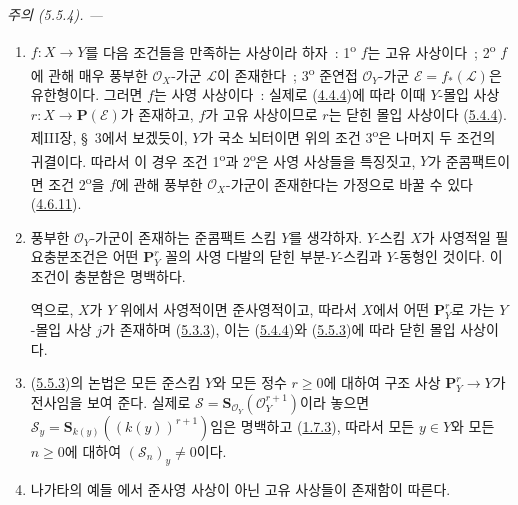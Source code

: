 \par\medskip\noindent\textit{주의 (5.5.4). ---\ }
\label{II.5.5.4-ko}
\begin{enumerate}
  \item[\rm{(i)}] $f:X\to Y$를 다음 조건들을 만족하는 사상이라 하자~:
  1\textsuperscript{o} $f$는 고유 사상이다~; 2\textsuperscript{o}
  $f$에 관해 매우 풍부한 $\mathcal{O}_X$-가군 $\mathcal{L}$이
  존재한다~; 3\textsuperscript{o} 준연접 $\mathcal{O}_Y$-가군
  $\mathcal{E}=f_*(\mathcal{L})$은 유한형이다. 그러면 $f$는 사영
  사상이다~: 실제로 (\hyperref[II.4.4.4-ko]{4.4.4})에 따라 이때
  $Y$-몰입 사상 $r:X\to\mathbf{P}(\mathcal{E})$가 존재하고, $f$가
  고유 사상이므로 $r$는 닫힌 몰입 사상이다
  (\hyperref[II.5.4.4-ko]{5.4.4}). 제III장, \S~3에서 보겠듯이, $Y$가
  국소 뇌터이면 위의 조건 3\textsuperscript{o}은 나머지 두 조건의
  귀결이다. 따라서 이 경우 조건 1\textsuperscript{o}과
  2\textsuperscript{o}은 사영 사상들을 특징짓고, $Y$가 준콤팩트이면
  조건 2\textsuperscript{o}을 $f$에 관해 풍부한
  $\mathcal{O}_X$-가군이 존재한다는 가정으로 바꿀 수 있다
  (\hyperref[II.4.6.11-ko]{4.6.11}).
  \item[\rm{(ii)}] 풍부한 $\mathcal{O}_Y$-가군이 존재하는 준콤팩트
  스킴 $Y$를 생각하자. $Y$-스킴 $X$가 사영적일 필요충분조건은 어떤
  $\mathbf{P}_Y^r$ 꼴의 사영 다발의 닫힌 부분-$Y$-스킴과
  $Y$-동형인 것이다. 이 조건이 충분함은 명백하다.


  역으로, $X$가 $Y$ 위에서 사영적이면 준사영적이고, 따라서 $X$에서
  어떤 $\mathbf{P}_Y^r$로 가는 $Y$-몰입 사상 $j$가 존재하며
  (\hyperref[II.5.3.3-ko]{5.3.3}), 이는
  (\hyperref[II.5.4.4-ko]{5.4.4})와
  (\hyperref[II.5.5.3-ko]{5.5.3})에 따라 닫힌 몰입 사상이다.
  \item[\rm{(iii)}] (\hyperref[II.5.5.3-ko]{5.5.3})의 논법은 모든
  준스킴 $Y$와 모든 정수 $r\geq0$에 대하여 구조 사상
  $\mathbf{P}_Y^r\to Y$가 전사임을 보여 준다. 실제로
  $\mathcal{S}=\mathbf{S}_{\mathcal{O}_Y}(\mathcal{O}_Y^{r+1})$이라
  놓으면
  $\mathcal{S}_y=\mathbf{S}_{k(y)}((k(y))^{r+1})$임은 명백하고
  (\hyperref[II.1.7.3-ko]{1.7.3}), 따라서 모든 $y\in Y$와 모든
  $n\geq0$에 대하여 $(\mathcal{S}_n)_y\neq0$이다.
  \item[\rm{(iv)}] 나가타의 예들 \cite{II-26}에서 준사영 사상이 아닌
  고유 사상들이 존재함이 따른다.
\end{enumerate}

